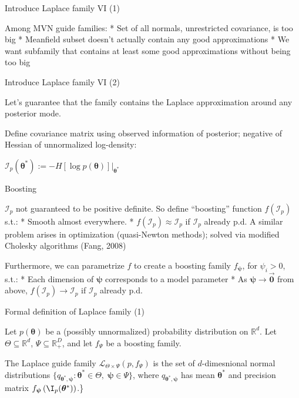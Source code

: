 \documentclass[ignorenonframetext,]{beamer}
\begin{document}
\begin{frame}{Introduce Laplace family VI (1)}

Among MVN guide families: * Set of all normals, unrestricted covariance,
is too big * Meanfield subset doesn't actually contain any good
approximations * We want subfamily that contains at least some good
approximations without being too big

\end{frame}

\begin{frame}{Introduce Laplace family VI (2)}

Let's guarantee that the family contains the Laplace approximation
around any posterior mode.

Define covariance matrix using observed information of posterior;
negative of Hessian of unnormalized log-density:

\(\mathcal{I}_p\left(\bm{\theta}^*\right) := -H\left[\log p(\bm{\theta})\right]\bigg\rvert_{\bm{\theta}^*}\)

\end{frame}

\begin{frame}{Boosting}

\(\mathcal{I}_p\) not guaranteed to be positive definite. So define
``boosting'' function \(f(\mathcal{I}_p)\) s.t.: * Smooth almost
everywhere. * \(f(\mathcal{I}_p)\approx\mathcal{I}_p\) if
\(\mathcal{I}_p\) already p.d. A similar problem arises in optimization
(quasi-Newton methods); solved via modified Cholesky algorithms (Fang,
2008)

Furthermore, we can parametrize \(f\) to create a boosting family
\(f_{\bm{\psi}}\), for \(\psi_i>0\), s.t.: * Each dimension of
\(\bm{\psi}\) corresponds to a model parameter * As
\(\bm{\psi}\rightarrow\vec{\bm{0}}\) from above,
\(f(\mathcal{I}_p)\rightarrow\mathcal{I}_p\) if \(\mathcal{I}_p\)
already p.d.

\end{frame}

\begin{frame}{Formal definition of Laplace family (1)}

Let \(p(\bm{\theta})\) be a (possibly unnormalized) probability
distribution on \(\mathbb{R}^d\). Let \(\Theta \subseteq \mathbb{R}^d\),
\(\Psi \subseteq \mathbb{R}^D_+\), and let \(f_\Psi\) be a boosting
family.

The Laplace guide family \(\mathcal{L}_{\Theta\times\Psi} (p,f_\Psi)\)
is the set of \(d\)-dimesnional normal distributions
\(\{q_{\bm{\theta}^*,\bm{\psi}}:\bm{\theta}^*\in\Theta,\;\bm{\psi}\in\Psi\}\),
where \(q_{\bm{\theta}^*,\bm{\psi}}\) has mean \(\bm{\theta}^*\) and
precision matrix \(f_{\bm{\psi}} \left(\I_p(\bm{\theta}^*)\right)\).\}

\end{frame}
\end{document}
